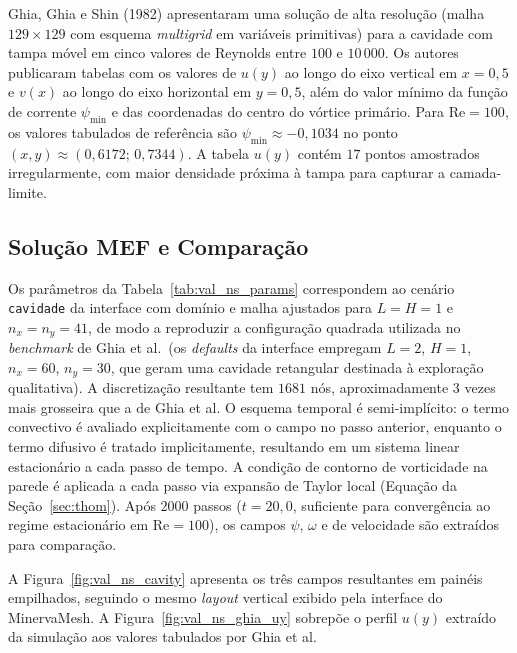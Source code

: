 Ghia, Ghia e Shin (1982) apresentaram uma solução de alta resolução (malha $129 \times 129$ com esquema \emph{multigrid} em variáveis primitivas) para a cavidade com tampa móvel em cinco valores de Reynolds entre $100$ e $10\,000$. Os autores publicaram tabelas com os valores de $u(y)$ ao longo do eixo vertical em $x = 0{,}5$ e $v(x)$ ao longo do eixo horizontal em $y = 0{,}5$, além do valor mínimo da função de corrente $\psi_{\min}$ e das coordenadas do centro do vórtice primário. Para $\mathrm{Re} = 100$, os valores tabulados de referência são $\psi_{\min} \approx -0{,}1034$ no ponto $(x,y) \approx (0{,}6172;\, 0{,}7344)$. A tabela $u(y)$ contém $17$ pontos amostrados irregularmente, com maior densidade próxima à tampa para capturar a camada-limite.

\subsection{Solução MEF e Comparação}

Os parâmetros da Tabela~\ref{tab:val_ns_params} correspondem ao cenário \texttt{cavidade} da interface com domínio e malha ajustados para $L = H = 1$ e $n_x = n_y = 41$, de modo a reproduzir a configuração quadrada utilizada no \emph{benchmark} de Ghia et al.\ (os \emph{defaults} da interface empregam $L = 2$, $H = 1$, $n_x = 60$, $n_y = 30$, que geram uma cavidade retangular destinada à exploração qualitativa). A discretização resultante tem $1681$ nós, aproximadamente $3$ vezes mais grosseira que a de Ghia et al. O esquema temporal é semi-implícito: o termo convectivo é avaliado explicitamente com o campo no passo anterior, enquanto o termo difusivo é tratado implicitamente, resultando em um sistema linear estacionário a cada passo de tempo. A condição de contorno de vorticidade na parede é aplicada a cada passo via expansão de Taylor local (Equação da Seção~\ref{sec:thom}). Após $2000$ passos ($t = 20{,}0$, suficiente para convergência ao regime estacionário em $\mathrm{Re} = 100$), os campos $\psi$, $\omega$ e de velocidade são extraídos para comparação.

A Figura~\ref{fig:val_ns_cavity} apresenta os três campos resultantes em painéis empilhados, seguindo o mesmo \emph{layout} vertical exibido pela interface do MinervaMesh. A Figura~\ref{fig:val_ns_ghia_uy} sobrepõe o perfil $u(y)$ extraído da simulação aos valores tabulados por Ghia et al.

